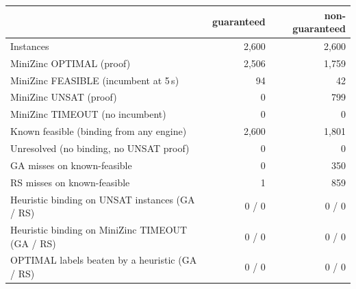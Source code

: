 \begin{tabular}{lrr}
\toprule
 & guaranteed & non-guaranteed \\
\midrule
Instances & 2,600 & 2,600 \\
MiniZinc OPTIMAL (proof) & 2,506 & 1,759 \\
MiniZinc FEASIBLE (incumbent at 5\,s) & 94 & 42 \\
MiniZinc UNSAT (proof) & 0 & 799 \\
MiniZinc TIMEOUT (no incumbent) & 0 & 0 \\
Known feasible (binding from any engine) & 2,600 & 1,801 \\
Unresolved (no binding, no UNSAT proof) & 0 & 0 \\
GA misses on known-feasible & 0 & 350 \\
RS misses on known-feasible & 1 & 859 \\
Heuristic binding on UNSAT instances (GA / RS) & 0 / 0 & 0 / 0 \\
Heuristic binding on MiniZinc TIMEOUT (GA / RS) & 0 / 0 & 0 / 0 \\
OPTIMAL labels beaten by a heuristic (GA / RS) & 0 / 0 & 0 / 0 \\
\bottomrule
\end{tabular}
